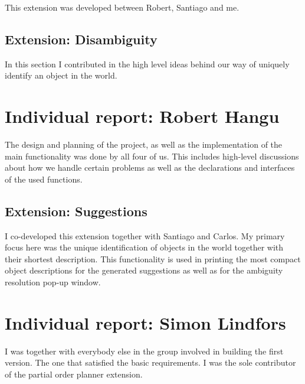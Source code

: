 \documentclass[11pt]{article}
\begin{document}
This extension was developed between Robert, Santiago and me.  \\

\subsection{Extension: Disambiguity}

In this section I contributed in the high level ideas behind our way of 
uniquely identify an object in the world.  \\

\section{Individual report: Robert Hangu}

The design and planning of the project, as well as the implementation of 
the main functionality was done by all four of us. This includes high-level 
discussions about how we handle certain problems as well as the declarations 
and interfaces of the used functions.

\subsection{Extension: Suggestions}

I co-developed this extension together with Santiago and Carlos. My primary 
focus here was the unique identification of objects in the world together with 
their shortest description. This functionality is used in printing the most 
compact object descriptions for the generated suggestions as well as for the 
ambiguity resolution pop-up window.

\section{Individual report: Simon Lindfors}

I was together with everybody else in the group involved in building the first 
version.  The one that satisfied the basic requirements.  I was the sole 
contributor of the partial order planner extension.
\end{document}
